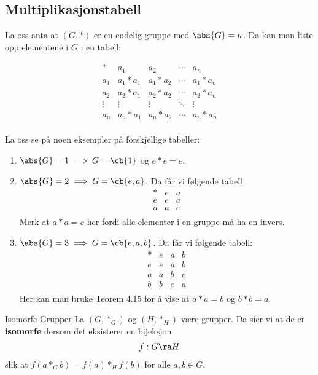 \subsection{Multiplikasjonstabell}
La oss anta at $(G, *)$ er en endelig gruppe med $\abs{G} = n$. Da kan man liste opp
elementene i $G$ i en tabell:

\[
	\begin{array}{c||cccc}
		*      & a_1     & a_2     & \cdots & a_n     \\
		\hline\hline
		a_1    & a_1*a_1 & a_1*a_2 & \cdots & a_1*a_n \\
		a_2    & a_2*a_1 & a_2*a_2 & \cdots & a_2*a_n \\
		\vdots & \vdots  & \vdots  & \ddots & \vdots  \\
		a_n    & a_n*a_1 & a_n*a_2 & \cdots & a_n*a_n \\
	\end{array}
\]

La oss se på noen eksempler på forskjellige tabeller:
\begin{enumerate}
	\item $\abs{G} = 1\implies G = \cb{1}$ og $e * e = e$.
	\item $\abs{G} = 2\implies G = \cb{e, a}$. Da får vi følgende tabell
	      \[
		      \begin{array}{c||cc}
			      * & e & a \\
			      \hline\hline
			      e & e & a \\
			      a & a & e \\
		      \end{array}
	      \]
	      Merk at $a * a = e$ her fordi alle elementer i en gruppe må ha en invers.
	\item $\abs{G} = 3\implies G = \cb{e, a, b}$. Da får vi følgende tabell:
	      \[
		      \begin{array}{c||ccc}
			      * & e & a & b \\
			      \hline\hline
			      e & e & a & b \\
			      a & a & b & e \\
			      b & b & e & a \\
		      \end{array}
	      \]
	      Her kan man bruke Teorem 4.15 for å vise at $a*a = b$ og $b*b = a$.
\end{enumerate}

\begin{definition}{Isomorfe Grupper}{}
	La $(G, *_G)$ og $(H, *_H)$ være grupper. Da sier vi at de er \textbf{isomorfe}
	dersom det eksisterer en bijeksjon
	\begin{align}
		f: G \ra H
	\end{align}
	slik at $f(a *_G b) = f(a) *_H f(b)$ for alle $a, b \in G$.
\end{definition}

